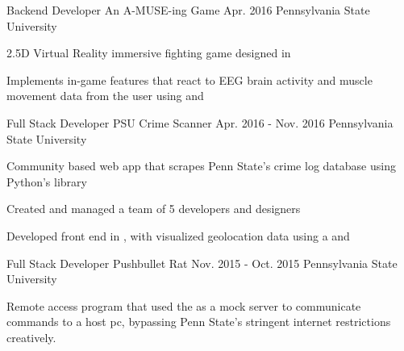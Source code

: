 \begin{cventries}
{\begin{cvitems}
      \end{cvitems}
    }
%
  \cventry
    {Backend Developer} %
    {An A-MUSE-ing Game} %
    {Apr. 2016} %
    {Pennsylvania State University} %
    {
      \begin{cvitems} %
        \item {2.5D Virtual Reality immersive fighting game designed in }
	\item {Implements in-game features that react to EEG brain activity and muscle movement data from the user using  and }
      \end{cvitems}
    }

  \cventry
    {Full Stack Developer} %
    {PSU Crime Scanner} %
    {Apr. 2016 - Nov. 2016} %
    {Pennsylvania State University} %
    {
      \begin{cvitems} %
        \item {Community based web app that scrapes Penn State’s crime log database using Python's  library}
        \item {Created and managed a team of 5 developers and designers}
	\item {Developed front end in , with visualized geolocation data using a  and }
      \end{cvitems}
    }
  \cventry
    {Full Stack Developer} %
    {Pushbullet Rat} %
    {Nov. 2015 - Oct. 2015} %
    {Pennsylvania State University} %
    {
      \begin{cvitems} %
        \item {Remote access program that used the  as a mock server to communicate commands to a host pc, bypassing Penn State’s stringent internet restrictions creatively.}
      \end{cvitems}
    }
    

\end{cventries}



